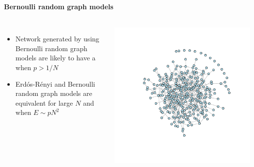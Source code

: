 \documentclass[8pt]{beamer}
\begin{document}
\begin{frame}
\frametitle{\insertsection}
\framesubtitle{Bernoulli random graph models}

\begin{columns}[c]

\begin{minipage}[c][.5\textheight][c]{\linewidth}


\begin{itemize}
\item Network generated by using Bernoulli random graph models are likely to have a {\color{blue}{giant component}} when $p>1/N$
\item Erd\'os-R\'enyi and Bernoulli random graph models are equivalent for large $N$ and when $E \sim pN^2$
\end{itemize}
\end{minipage}	   


\begin{minipage}[c][.5\textheight][c]{\linewidth}
\centering
\includegraphics[height=0.8\textheight]{bernoulli_giant}
\end{minipage}

\end{columns}

\end{frame}
\end{document}
